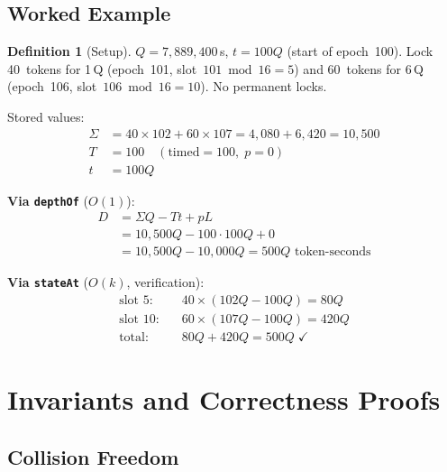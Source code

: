 \documentclass[10pt,a4paper,twocolumn]{article}
\theoremstyle{definition}
\newtheorem{definition}{Definition}[section]
\theoremstyle{plain}
\theoremstyle{remark}
\begin{document}
\FloatBarrier

\subsection{Worked Example}
\label{subsec:worked-example}

\begin{definition}[Setup]
$Q = 7{,}889{,}400$\,s, $t = 100Q$ (start of epoch~100). Lock 40~tokens for 1\,Q (epoch~101, slot~$101 \bmod 16 = 5$) and 60~tokens for 6\,Q (epoch~106, slot~$106 \bmod 16 = 10$). No permanent locks.
\end{definition}

Stored values:
\begin{align*}
\Sigma &= 40 \times 102 + 60 \times 107 = 4{,}080 + 6{,}420 = 10{,}500 \\
T &= 100 \quad (\text{timed} = 100, \; p = 0) \\
t &= 100Q
\end{align*}

\textbf{Via \texttt{depthOf}} ($O(1)$):
\begin{align*}
D &= \Sigma Q - Tt + pL \\
  &= 10{,}500Q - 100 \cdot 100Q + 0 \\
  &= 10{,}500Q - 10{,}000Q = 500Q \text{ token-seconds}
\end{align*}

\textbf{Via \texttt{stateAt}} ($O(k)$, verification):
\begin{align*}
\text{slot 5:}\quad & 40 \times (102Q - 100Q) = 80Q \\
\text{slot 10:}\quad & 60 \times (107Q - 100Q) = 420Q \\
\text{total:}\quad & 80Q + 420Q = 500Q \;\checkmark
\end{align*}

\section{Invariants and Correctness Proofs}
\label{sec:proofs}

\subsection{Collision Freedom}
\end{document}
